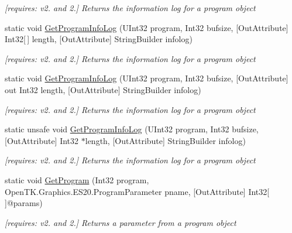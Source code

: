 \begin{DoxyCompactItemize}
\begin{DoxyCompactList}\small\item\em \mbox{[}requires\-: v2. and 2.\mbox{]} Returns the information log for a program object \end{DoxyCompactList}\item 
static void \hyperlink{class_open_t_k_1_1_graphics_1_1_e_s20_1_1_g_l_abb720aab96c0310165ec3d564b9bccdb}{Get\-Program\-Info\-Log} (U\-Int32 program, Int32 bufsize, \mbox{[}Out\-Attribute\mbox{]} Int32\mbox{[}$\,$\mbox{]} length, \mbox{[}Out\-Attribute\mbox{]} String\-Builder infolog)
\begin{DoxyCompactList}\small\item\em \mbox{[}requires\-: v2. and 2.\mbox{]} Returns the information log for a program object \end{DoxyCompactList}\item 
static void \hyperlink{class_open_t_k_1_1_graphics_1_1_e_s20_1_1_g_l_a972813c8c4584fe69db509054adda592}{Get\-Program\-Info\-Log} (U\-Int32 program, Int32 bufsize, \mbox{[}Out\-Attribute\mbox{]} out Int32 length, \mbox{[}Out\-Attribute\mbox{]} String\-Builder infolog)
\begin{DoxyCompactList}\small\item\em \mbox{[}requires\-: v2. and 2.\mbox{]} Returns the information log for a program object \end{DoxyCompactList}\item 
static unsafe void \hyperlink{class_open_t_k_1_1_graphics_1_1_e_s20_1_1_g_l_aa4e74d5ff3e0e0dc22f15df24e7dac66}{Get\-Program\-Info\-Log} (U\-Int32 program, Int32 bufsize, \mbox{[}Out\-Attribute\mbox{]} Int32 $\ast$length, \mbox{[}Out\-Attribute\mbox{]} String\-Builder infolog)
\begin{DoxyCompactList}\small\item\em \mbox{[}requires\-: v2. and 2.\mbox{]} Returns the information log for a program object \end{DoxyCompactList}\item 
static void \hyperlink{class_open_t_k_1_1_graphics_1_1_e_s20_1_1_g_l_a66264a97b1158c30d1270bbd8324445e}{Get\-Program} (Int32 program, Open\-T\-K.\-Graphics.\-E\-S20.\-Program\-Parameter pname, \mbox{[}Out\-Attribute\mbox{]} Int32\mbox{[}$\,$\mbox{]}@params)
\begin{DoxyCompactList}\small\item\em \mbox{[}requires\-: v2. and 2.\mbox{]} Returns a parameter from a program object \end{DoxyCompactList}\item 

\end{DoxyCompactItemize}
